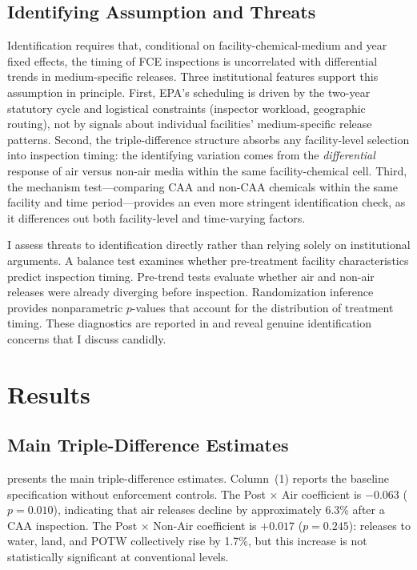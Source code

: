 \documentclass[12pt]{article}
\begin{document}
\subsection{Identifying Assumption and Threats}

Identification requires that, conditional on facility-chemical-medium and year fixed effects, the timing of FCE inspections is uncorrelated with differential trends in medium-specific releases. Three institutional features support this assumption in principle. First, EPA's scheduling is driven by the two-year statutory cycle and logistical constraints (inspector workload, geographic routing), not by signals about individual facilities' medium-specific release patterns. Second, the triple-difference structure absorbs any facility-level selection into inspection timing: the identifying variation comes from the \textit{differential} response of air versus non-air media within the same facility-chemical cell. Third, the mechanism test---comparing CAA and non-CAA chemicals within the same facility and time period---provides an even more stringent identification check, as it differences out both facility-level and time-varying factors.

I assess threats to identification directly rather than relying solely on institutional arguments. A balance test examines whether pre-treatment facility characteristics predict inspection timing. Pre-trend tests evaluate whether air and non-air releases were already diverging before inspection. Randomization inference provides nonparametric $p$-values that account for the distribution of treatment timing. These diagnostics are reported in  and reveal genuine identification concerns that I discuss candidly.


\section{Results}
\label{sec:results}

\subsection{Main Triple-Difference Estimates}



 presents the main triple-difference estimates. Column~(1) reports the baseline specification without enforcement controls. The Post $\times$ Air coefficient is $-0.063$ ($p = 0.010$), indicating that air releases decline by approximately 6.3\% after a CAA inspection. The Post $\times$ Non-Air coefficient is $+0.017$ ($p = 0.245$): releases to water, land, and POTW collectively rise by 1.7\%, but this increase is not statistically significant at conventional levels.
\end{document}
